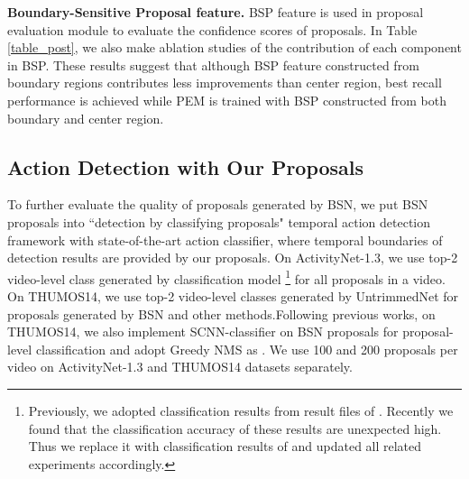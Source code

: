 \documentclass[runningheads]{llncs}
\begin{document}
\noindent
{\bf Boundary-Sensitive Proposal feature.}
BSP feature is used in proposal evaluation module to evaluate the confidence scores of proposals. In Table \ref{table_post}, we also make ablation studies of the contribution of each component in BSP.  These results suggest that although BSP feature constructed from   boundary regions contributes less improvements than  center region, best recall performance is achieved while PEM is trained with BSP constructed from both boundary and center region.





\vspace{-0.25cm}

\subsection{Action Detection with  Our Proposals}

To further evaluate the quality of proposals generated by BSN, we put BSN proposals into ``detection by classifying proposals" temporal action detection framework with state-of-the-art action classifier, where  temporal boundaries of detection results are provided by our proposals.
On ActivityNet-1.3, we use top-2 video-level class generated by classification model \cite{zhao2017cuhk}\footnote{Previously, we adopted classification results from result files of \cite{wang2016uts}. Recently we found that the classification accuracy of these results are unexpected high. Thus we replace it with classification results of \cite{zhao2017cuhk} and updated all related experiments accordingly.}  for all proposals in a video. On THUMOS14, we use top-2 video-level classes generated by UntrimmedNet \cite{wang2017untrimmednets} for proposals generated by BSN and other methods.Following  previous works,  on THUMOS14, we also implement SCNN-classifier on BSN proposals for proposal-level classification and  adopt Greedy NMS  as \cite{shou2016action}.
We use 100 and 200 proposals per video on ActivityNet-1.3  and THUMOS14 datasets separately.
\end{document}
